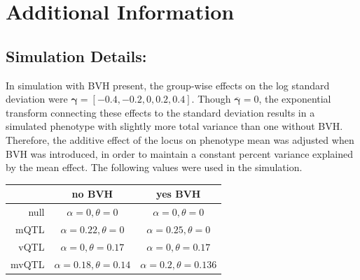 

\section{Additional Information}

\subsection{Simulation Details:}

    In simulation with BVH present, the group-wise effects on the log standard deviation were $\bm{\gamma} = [-0.4, -0.2, 0, 0.2, 0.4]$.
    Though $\overline{\bm{\gamma}} = 0$, the exponential transform connecting these effects to the standard deviation results in a simulated phenotype with slightly more total variance than one without BVH.
    Therefore, the additive effect of the locus on phenotype mean was adjusted when BVH was introduced, in order to maintain a constant percent variance explained by the mean effect.
    The following values were used in the simulation.

    \begin{table}[ht]
        \centering
        \begin{tabular}{rcc}
            \hline
                    & no BVH                                & yes BVH                        \\
            \hline
            null    & $\alpha = 0, \theta = 0$              & $\alpha = 0, \theta = 0$          \\
            mQTL    & $\alpha = 0.22, \theta = 0$           & $\alpha = 0.25, \theta = 0$          \\
            vQTL    & $\alpha = 0, \theta = 0.17$           & $\alpha = 0, \theta = 0.17$          \\
            mvQTL   & $\alpha = 0.18, \theta = 0.14$        & $\alpha = 0.2, \theta = 0.136$          \\
            \hline
        \end{tabular}
    \end{table}

